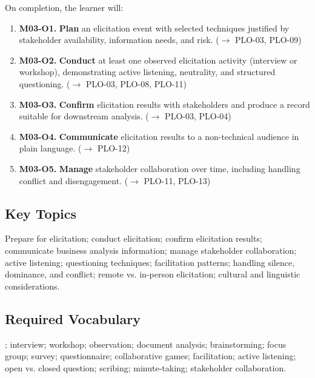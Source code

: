 \documentclass[11pt,letterpaper,oneside]{report}
\begin{document}
\begin{outcomes}
On completion, the learner will:
\begin{enumerate}
  \item \textbf{M03-O1.} \textbf{Plan} an elicitation event with selected techniques justified by stakeholder availability, information needs, and risk. ($\to$ PLO-03, PLO-09)
  \item \textbf{M03-O2.} \textbf{Conduct} at least one observed elicitation activity (interview or workshop), demonstrating active listening, neutrality, and structured questioning. ($\to$ PLO-03, PLO-08, PLO-11)
  \item \textbf{M03-O3.} \textbf{Confirm} elicitation results with stakeholders and produce a record suitable for downstream analysis. ($\to$ PLO-03, PLO-04)
  \item \textbf{M03-O4.} \textbf{Communicate} elicitation results to a non-technical audience in plain language. ($\to$ PLO-12)
  \item \textbf{M03-O5.} \textbf{Manage} stakeholder collaboration over time, including handling conflict and disengagement. ($\to$ PLO-11, PLO-13)
\end{enumerate}
\end{outcomes}

\subsection*{Key Topics}
Prepare for elicitation; conduct elicitation; confirm elicitation results; communicate business analysis information; manage stakeholder collaboration; active listening; questioning techniques; facilitation patterns; handling silence, dominance, and conflict; remote vs. in-person elicitation; cultural and linguistic considerations.

\subsection*{Required Vocabulary}
; interview; workshop; observation; document analysis; brainstorming; focus group; survey; questionnaire; collaborative games; facilitation; active listening; open vs. closed question; scribing; minute-taking; stakeholder collaboration.
\end{document}
